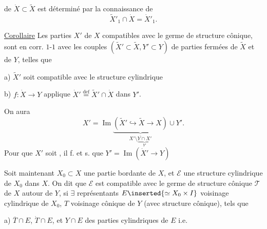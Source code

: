 de $\dot X\subset\widetilde X$ est déterminé par la connaissance de
\[
\widetilde X'_1\cap\dot X=\dot X'_1.
\]

\uline{Corollaire} Les parties  $X'$ de $X$ compatibles avec
le germe de structure cônique, sont en
corr. $1$-$1$ avec les couples $(\widetilde X'\subset\widetilde X,Y'\subset Y)$
de parties fermées de $\widetilde X$ et de $Y$, telles que

a) $\widetilde X'$ soit compatible avec le  structure cylindrique

b) $f:\dot X\to Y$ applique 
$\dot X'\overset{\mathrm{def}}=\widetilde X'\cap\dot X$ dans $Y'$.

On aura
\[
X'=\operatorname{Im}\underbrace{(\widetilde X'\hookrightarrow\widetilde X\to X)}
_{\overline{X'\setminus\underbrace{Y\cap X'}_{Y'}}}\cup Y'.
\]
Pour que $X'$ soit 
,
il f. et s. que $Y'=\operatorname{Im}(\dot X'\to Y)$

Soit maintenant $X_0\subset X$ une partie
bordante de $X$, et $\mathcal E$ une  structure cylindrique
de $X_0$ dans $X$. On dit que $\mathcal E$ est compatible
avec le germe de structure cônique $\mathcal T$
de $X$ autour de $Y$, si $\exists$ représentants
$E\inserted{\simeq X_0\times I}$ voisinage cylindrique de $X_0$,  $T$ voisinage
cônique de $Y$ (avec  structure cônique), tels que


a) $\overline T\cap E$, $\dot T\cap E$, et $Y\cap E$ 
 des parties cylindriques de
$E$ i.e.



